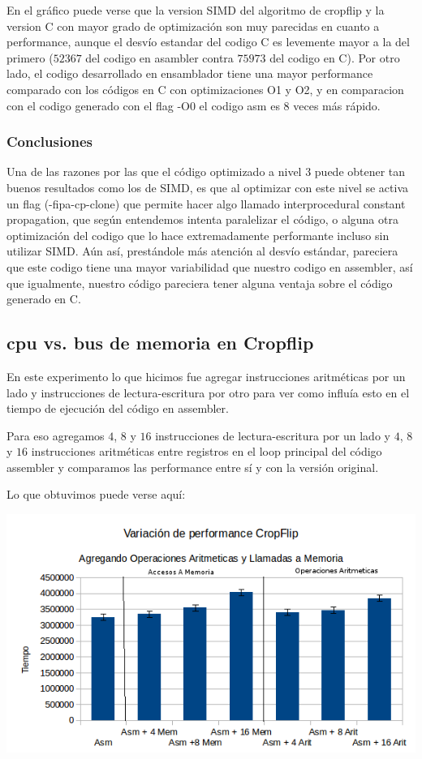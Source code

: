 \documentclass[a4paper]{article}
\begin{document}
En el gráfico puede verse que la version SIMD del algoritmo de cropflip  y la version C con mayor grado de optimización son muy parecidas en cuanto a performance, aunque el desvío estandar del codigo C es levemente mayor a la del primero ($52367$ del codigo en asambler contra $75973$ del codigo en C). Por otro lado, el codigo desarrollado en ensamblador tiene una mayor performance comparado con los códigos en C con optimizaciones O1 y O2, y en comparacion con el codigo generado con el flag -O0 el codigo asm es 8 veces más rápido.

\subsubsection{Conclusiones}
Una de las razones por las que el código optimizado a nivel 3 puede obtener tan buenos resultados como los de SIMD, es que al optimizar con este nivel se activa un flag (-fipa-cp-clone) que permite hacer algo llamado interprocedural constant propagation, que según entendemos intenta paralelizar el código, o alguna otra optimización del codigo que lo hace extremadamente performante incluso sin utilizar SIMD. Aún así, prestándole más atención al desvío estándar, pareciera que este codigo tiene una mayor variabilidad que nuestro codigo en assembler, así que igualmente, nuestro código pareciera tener alguna ventaja sobre el código generado en C.

\newpage

\subsection{cpu vs. bus de memoria en Cropflip}

En este experimento lo que hicimos fue agregar instrucciones aritméticas por un lado y instrucciones de lectura-escritura por otro para ver como influía esto en el tiempo de ejecución del código en assembler.

Para eso agregamos $4$, $8$ y $16$ instrucciones de lectura-escritura por un lado y $4$, $8$ y $16$ instrucciones aritméticas entre registros en el loop principal del código assembler y comparamos las performance entre sí y con la versión original.

Lo que obtuvimos puede verse aquí:

  \begin{center}
  \includegraphics[scale=0.66]{Graficos1.5/crop/per.png}
  \end{center}
\end{document}
